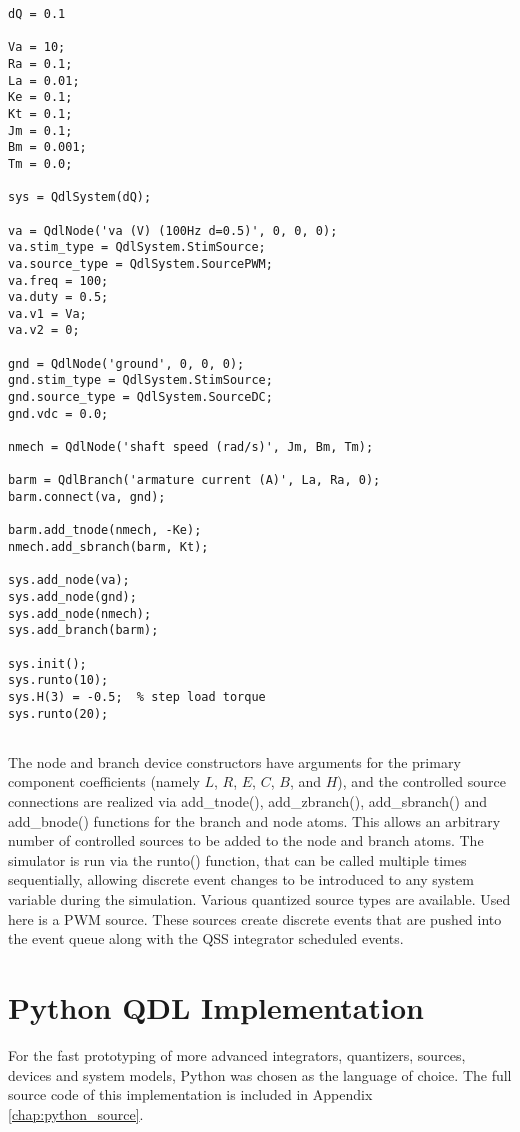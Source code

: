 \begin{lstlisting}
dQ = 0.1

Va = 10;
Ra = 0.1;
La = 0.01;
Ke = 0.1;
Kt = 0.1;
Jm = 0.1;
Bm = 0.001;
Tm = 0.0;

sys = QdlSystem(dQ);

va = QdlNode('va (V) (100Hz d=0.5)', 0, 0, 0);
va.stim_type = QdlSystem.StimSource;
va.source_type = QdlSystem.SourcePWM;
va.freq = 100; 
va.duty = 0.5; 
va.v1 = Va; 
va.v2 = 0; 

gnd = QdlNode('ground', 0, 0, 0);
gnd.stim_type = QdlSystem.StimSource;
gnd.source_type = QdlSystem.SourceDC;
gnd.vdc = 0.0; 

nmech = QdlNode('shaft speed (rad/s)', Jm, Bm, Tm);

barm = QdlBranch('armature current (A)', La, Ra, 0);
barm.connect(va, gnd);

barm.add_tnode(nmech, -Ke);
nmech.add_sbranch(barm, Kt);

sys.add_node(va);
sys.add_node(gnd);
sys.add_node(nmech);
sys.add_branch(barm);

sys.init();
sys.runto(10);
sys.H(3) = -0.5;  % step load torque
sys.runto(20);
    
\end{lstlisting}

The node and branch device constructors have arguments for the primary component coefficients (namely $L$, $R$, $E$, $C$, $B$, and $H$), and the controlled source connections are realized via add\_tnode(), add\_zbranch(), add\_sbranch() and add\_bnode() functions for the branch and node atoms. This allows an arbitrary number of controlled sources to be added to the node and branch atoms. The simulator is run via the runto() function, that can be called multiple times sequentially, allowing discrete event changes to be introduced to any system variable during the simulation. Various quantized source types are available. Used here is a PWM source. These sources create discrete events that are pushed into the event queue along with the QSS integrator scheduled events.

\section{Python QDL Implementation} 

For the fast prototyping of more advanced integrators, quantizers, sources, devices and system models, Python was chosen as the language of choice. The full source code of this implementation is included in Appendix \ref{chap:python_source}. 


